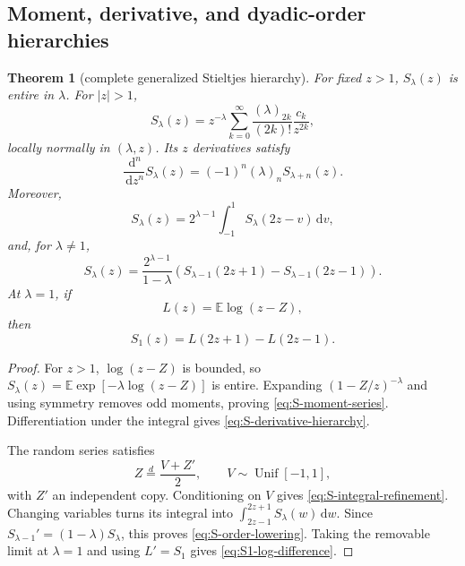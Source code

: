 \documentclass[11pt,oneside]{article}
\numberwithin{equation}{section}
\theoremstyle{plain}
\newtheorem{theorem}{Theorem}[section]
\theoremstyle{definition}
\theoremstyle{remark}
\newcommand{\E}{\mathbb E}
\newcommand{\dd}{\,\mathrm d}
\begin{document}
\subsection{Moment, derivative, and dyadic-order hierarchies}

\begin{theorem}[complete generalized Stieltjes hierarchy]
\label{thm:Stieltjes-hierarchy}
For fixed $z>1$, $S_\lambda(z)$ is entire in $\lambda$.  For $|z|>1$,
\begin{equation}
 S_\lambda(z)
 =z^{-\lambda}\sum_{k=0}^{\infty}
   \frac{(\lambda)_{2k}}{(2k)!}\frac{c_k}{z^{2k}},
 \label{eq:S-moment-series}
\end{equation}
locally normally in $(\lambda,z)$.  Its $z$ derivatives satisfy
\begin{equation}
 \frac{\dd^n}{\dd z^n}S_\lambda(z)
 =(-1)^n(\lambda)_nS_{\lambda+n}(z).
 \label{eq:S-derivative-hierarchy}
\end{equation}
Moreover,
\begin{equation}
 S_\lambda(z)
 =2^{\lambda-1}\int_{-1}^{1}S_\lambda(2z-v)\dd v,
 \label{eq:S-integral-refinement}
\end{equation}
and, for $\lambda\ne1$,
\begin{equation}
 S_\lambda(z)
 =\frac{2^{\lambda-1}}{1-\lambda}
  \left(S_{\lambda-1}(2z+1)-S_{\lambda-1}(2z-1)\right).
 \label{eq:S-order-lowering}
\end{equation}
At $\lambda=1$, if
\begin{equation}
 L(z)=\E\log(z-Z),
 \label{eq:log-potential}
\end{equation}
then
\begin{equation}
 S_1(z)=L(2z+1)-L(2z-1).
 \label{eq:S1-log-difference}
\end{equation}
\end{theorem}

\begin{proof}
For $z>1$, $\log(z-Z)$ is bounded, so
$S_\lambda(z)=\E\exp[-\lambda\log(z-Z)]$ is entire.  Expanding
$(1-Z/z)^{-\lambda}$ and using symmetry removes odd moments, proving
\cref{eq:S-moment-series}.  Differentiation under the integral gives
\cref{eq:S-derivative-hierarchy}.

The random series satisfies
\begin{equation}
 Z\overset d=\frac{V+Z'}2,
 \qquad V\sim\operatorname{Unif}[-1,1],
 \label{eq:Z-smoothing}
\end{equation}
with $Z'$ an independent copy.  Conditioning on $V$ gives
\cref{eq:S-integral-refinement}.  Changing variables turns its integral into
$\int_{2z-1}^{2z+1}S_\lambda(w)\dd w$.  Since
$S_{\lambda-1}'=(1-\lambda)S_\lambda$, this proves
\cref{eq:S-order-lowering}.  Taking the removable limit at $\lambda=1$ and
using $L'=S_1$ gives \cref{eq:S1-log-difference}.
\end{proof}
\end{document}
